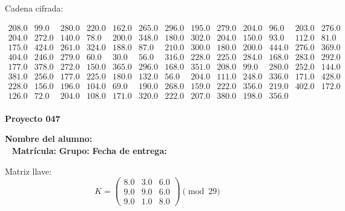 \documentclass[12pt]{article}
\begin{document}
Cadena cifrada:
\begin{center}
$\begin{array}{lllllllllllll}
208.0 & 99.0 & 280.0 & 220.0 & 162.0 & 265.0 & 296.0 & 195.0 & 279.0 & 204.0 & 96.0 & 203.0 & 276.0\\
204.0 & 272.0 & 140.0 & 78.0 & 200.0 & 348.0 & 180.0 & 302.0 & 204.0 & 150.0 & 93.0 & 112.0 & 81.0\\
175.0 & 424.0 & 261.0 & 324.0 & 188.0 & 87.0 & 210.0 & 300.0 & 180.0 & 200.0 & 444.0 & 276.0 & 369.0\\
404.0 & 246.0 & 279.0 & 60.0 & 30.0 & 56.0 & 316.0 & 228.0 & 225.0 & 284.0 & 168.0 & 283.0 & 292.0\\
177.0 & 378.0 & 272.0 & 150.0 & 365.0 & 296.0 & 168.0 & 351.0 & 208.0 & 99.0 & 280.0 & 252.0 & 144.0\\
381.0 & 256.0 & 177.0 & 225.0 & 180.0 & 132.0 & 56.0 & 204.0 & 111.0 & 248.0 & 336.0 & 171.0 & 428.0\\
228.0 & 156.0 & 196.0 & 104.0 & 69.0 & 190.0 & 268.0 & 159.0 & 222.0 & 356.0 & 219.0 & 402.0 & 172.0\\
126.0 & 72.0 & 204.0 & 108.0 & 171.0 & 320.0 & 222.0 & 207.0 & 380.0 & 198.0 & 356.0\\
\end{array}$
\end{center}

\newpage


\textbf{Proyecto 047}

\textbf{Nombre del alumno:} \underline{\hspace{13cm}}\\\
\vspace{1cm}
\textbf{Matrícula:} \underline{\hspace{4cm}} \hspace{1cm}
\textbf{Grupo:} \underline{\hspace{2cm}}
\textbf{Fecha de entrega:} \underline{\hspace{2cm}}

\medskip

Matriz llave:
\[
K = \begin{pmatrix}
8.0 & 3.0 & 6.0\\
9.0 & 9.0 & 6.0\\
9.0 & 1.0 & 8.0
\end{pmatrix} \pmod{29}
\]
\end{document}
